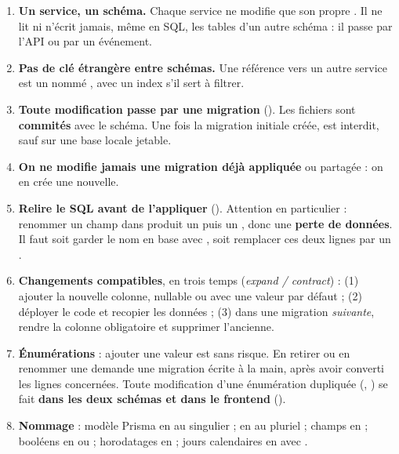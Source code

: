\begin{tcolorbox}[colback=soft,colframe=navy,title=\textbf{Règles à respecter pour toute modification de la base},fonttitle=\bfseries,breakable,arc=2pt]
\begin{enumerate}[label=\textbf{R\arabic*.},leftmargin=2.2em]
  \item \textbf{Un service, un schéma.} Chaque service ne modifie que son propre . Il ne lit ni n'écrit jamais, même en SQL, les tables d'un autre schéma : il passe par l'API ou par un événement.
  \item \textbf{Pas de clé étrangère entre schémas.} Une référence vers un autre service est un  nommé , avec un index s'il sert à filtrer.
  \item \textbf{Toute modification passe par une migration} (). Les fichiers  sont \textbf{commités} avec le schéma. Une fois la migration initiale créée,  est interdit, sauf sur une base locale jetable.
  \item \textbf{On ne modifie jamais une migration déjà appliquée} ou partagée : on en crée une nouvelle.
  \item \textbf{Relire le SQL avant de l'appliquer} (). Attention en particulier : renommer un champ dans  produit un  puis un , donc une \textbf{perte de données}. Il faut soit garder le nom en base avec , soit remplacer ces deux lignes par un .
  \item \textbf{Changements compatibles}, en trois temps (\emph{expand / contract}) : (1) ajouter la nouvelle colonne, nullable ou avec une valeur par défaut ; (2) déployer le code et recopier les données ; (3) dans une migration \emph{suivante}, rendre la colonne obligatoire et supprimer l'ancienne.
  \item \textbf{Énumérations} : ajouter une valeur est sans risque. En retirer ou en renommer une demande une migration écrite à la main, après avoir converti les lignes concernées. Toute modification d'une énumération dupliquée (, ) se fait \textbf{dans les deux schémas et dans le frontend} ().
  \item \textbf{Nommage} : modèle Prisma en  au singulier ;  en  au pluriel ; champs en  ; booléens en  ou  ; horodatages en  ; jours calendaires en  avec .

\end{enumerate}
\end{tcolorbox}
